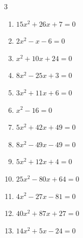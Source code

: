 \begin{multicols}{3}
\begin{enumerate}

  \item $15x^{2}+26x+7=0$


  \item $2x^{2}-x-6=0$


  \item $x^{2}+10x+24=0$

        \phantom{$\displaystyle x=-6,\; -4$}

  \item $8x^{2}-25x+3=0$


  \item $3x^{2}+11x+6=0$


  \item $x^{2}-16=0$

        \phantom{$\displaystyle x=-4,\; 4$}

\columnbreak %

  \item $5x^{2}+42x+49=0$


  \item $8x^{2}-49x-49=0$


  \item $5x^{2}+12x+4=0$


  \item $25x^{2}-80x+64=0$


  \item $4x^{2}-27x-81=0$


  \item $40x^{2}+87x+27=0$


  \item $14x^{2}+5x-24=0$


\end{enumerate}
\end{multicols}
